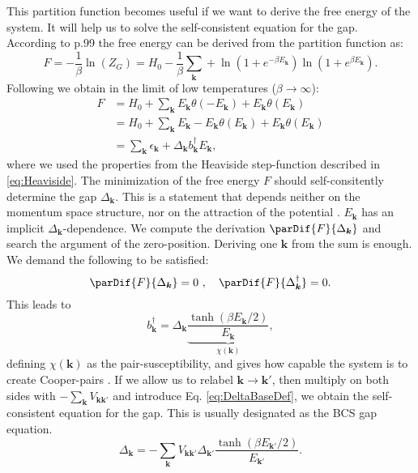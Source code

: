 \documentclass[../main.tex]{subfile}
\begin{document}
This partition function becomes useful if we want to derive the free energy of the system. It will help us to solve the self-consistent equation for the gap.\\
According to \cite{FuchsBaugaertel2023} p.99 the free energy can be derived from the partition function as:
\[
    F = -\frac{1}{\beta}\ln(Z_G) = H_0 -\frac{1}{\beta}\sum_{\bm{k}} + \ln\left(1 + e^{-\beta E_{\bm{k}}}\right)\ln\left(1 + e^{\beta E_{\bm{k}}}\right).
\]
Following \cite{FossheimSudbo2004} we obtain in the limit of low temperatures ($\beta\rightarrow \infty$):
\begin{align*}
    F &= H_0 + \sum_{\bm{k}} E_{\bm{k}} \theta\left(-E_{\bm{k}}\right) + E_{\bm{k}} \theta\left(E_{\bm{k}}\right)\\
      &= H_0 + \sum_{\bm{k}} E_{\bm{k}} - E_{\bm{k}}\theta\left(E_{\bm{k}}\right) + E_{\bm{k}} \theta\left(E_{\bm{k}}\right)\\
      &= \sum_{\bm{k}} \epsilon_{\bm{k}} + \Delta_{\bm{k}}b_{\bm{k}}^{\dagger} E_{\bm{k}},
\end{align*}
where we used the properties from the Heaviside step-function described in \ref{eq:Heaviside}.
The minimization of the free energy $F$ should self-consitently determine the gap $\Delta_{\bm{k}}$. This is a statement that depends neither on the momentum space structure,
nor on the attraction of the potential \cite{FossheimSudbo2004}. $E_{\bm{k}}$ has an implicit $\Delta_{\bm{k}}$-dependence.
We compute the derivation $\parDif{F}{\Delta_{\bm{k}}}$ and search the argument of the zero-position. Deriving one $\bm{k} $ from the sum is enough. We demand the following
to be satisfied:
\begin{equation}
    \parDif{F}{\Delta_{\bm{k}}} = 0 ~,~~~ \parDif{F}{\Delta_{\bm{k}}^{\dagger}} = 0.
\end{equation}
This leads to
\begin{equation*}
    b_{\bm{k}}^{\dagger} = \Delta_{\bm{k}} \underbrace{\frac{\tanh(\beta E_{\bm{k}}/2)}{E_{\bm{k}}}}_{\chi(\bm{k})},
\end{equation*}
defining $\chi(\bm{k})$ as the pair-susceptibility, and gives how capable the system is to create Cooper-pairs \cite{FossheimSudbo2004}. If we allow us to relabel 
$\bm{k}\rightarrow\bm{k}'$, then multiply on both sides
with $-\sum_{\bm{k}} V_{\bm{k}\bm{k}'}$ and introduce Eq. \ref{eq:DeltaBaseDef}, we obtain the self-consistent equation for the gap. This is usually designated as the BCS gap equation.
\begin{equation}\label{eq:BCS_gap_eq}
    \Delta_{\bm{k}} = -\sum_{\bm{k}} V_{\bm{k}\bm{k}'} \Delta_{\bm{k}'}\frac{\tanh(\beta E_{\bm{k}'}/2)}{E_{\bm{k}'}}.
\end{equation}
\end{document}
